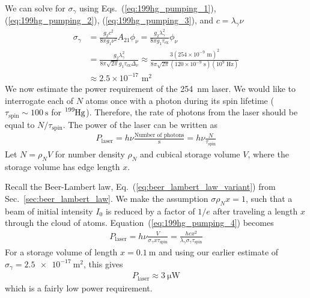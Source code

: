 We can solve for $\sigma_\gamma$ using Eqs.~(\ref{eq:199hg_pumping_1}), (\ref{eq:199hg_pumping_2}), (\ref{eq:199hg_pumping_3}), and $c=\lambda_\gamma \nu$ 
%
\begin{align}
    \sigma_\gamma &= \frac{g_2 c^2}{8\pi g_1 \nu^2}A_{21}\phi_\nu = \frac{g_2 \lambda_\gamma^2}{8\pi g_1 \tau_\text{ex}}\phi_\nu \nonumber \\
    &= \frac{g_2 \lambda_\gamma^2}{8\pi \sqrt{2\pi} g_1 \tau_\text{ex}\Delta_\nu} \approx \frac{3 (254\times 10^{-9} \text{ m})^2}{8\pi\sqrt{2\pi} (120\times 10^{-9}\text{ s})(10^9\text{ Hz})} \nonumber \\
    &\approx 2.5 \times 10^{-17} \text{ m}^2
\end{align}
%
We now estimate the power requirement of the \qty{254}{\nano\meter} laser. We would like to interrogate each of $N$ atoms once with a photon during its spin lifetime ($\tau_\text{spin}\sim \qty{100}{\s}$ for $\ce{^199Hg}$). Therefore, the rate of photons from the laser should be equal to $N/\tau_\text{spin}$. The power of the laser can be written as
%
\begin{gather}
    P_\text{laser}=h\nu \frac{\text{Number of photons}}{\text{s}}=h\nu\frac{N}{\tau_\text{spin}}\label{eq:199hg_pumping_4}
\end{gather}
%
Let $N=\rho_N V$ for number density $\rho_N$ and cubical storage volume $V$, where the storage volume has edge length $x$.

Recall the Beer-Lambert law, Eq.~(\ref{eq:beer_lambert_law_variant}) from Sec.~\ref{sec:beer_lambert_law}. We make the assumption $\sigma \rho_N x=1$, such that a beam of initial intensity $I_0$ is reduced by a factor of $1/e$ after traveling a length $x$ through the cloud of atoms. Equation~(\ref{eq:199hg_pumping_4}) becomes
%
\begin{gather}
    P_\text{laser}=h\nu \frac{V}{\sigma_\gamma x \tau_\text{spin}} = \frac{hcx^2}{\lambda_\gamma \sigma_\gamma \tau_\text{spin}}
\end{gather}
%
For a storage volume of length $x=\qty{0.1}{\meter}$ and using our earlier estimate of $\sigma_\gamma=\qty{2.5e-17}{\meter^2}$, this gives
%
\begin{gather}
    P_\text{laser}\approx \qty{3}{\micro\watt}
\end{gather}
%
which is a fairly low power requirement.